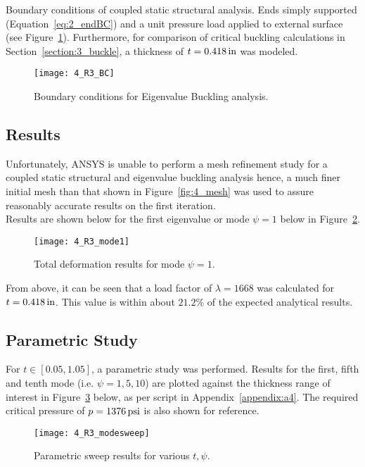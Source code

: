 Boundary conditions of coupled static structural analysis. Ends simply supported (Equation~\ref{eq:2_endBC}) and a unit pressure load applied to external surface (see Figure~\ref{fig:4_R3_BC}). Furthermore, for comparison of critical buckling calculations in Section~\ref{section:3_buckle}, a thickness of $t=0.418\,\mathrm{in}$ was modeled. 

\begin{figure}[H]
	\centering
	\texttt{[image: 4\_R3\_BC]}
	\caption{Boundary conditions for Eigenvalue Buckling analysis.}
	\label{fig:4_R3_BC}
\end{figure}

\subsection{Results}

Unfortunately, ANSYS is unable to perform a mesh refinement study for a coupled static structural and eigenvalue buckling analysis hence, a much finer initial mesh than that shown in Figure~\ref{fig:4_mesh} was used to assure reasonably accurate results on the first iteration.\\

Results are shown below for the first eigenvalue or mode $\psi = 1$ below in Figure~\ref{fig:4_R3_mode1}.
\begin{figure}[H]
	\centering
	\texttt{[image: 4\_R3\_mode1]}
	\caption{Total deformation results for mode $\psi = 1$.}
	\label{fig:4_R3_mode1}
\end{figure}

From above, it can be seen that a load factor of $\lambda = 1668$ was calculated for $t= 0.418\,\mathrm{in}$. This value is within about $21.2\%$ of the expected analytical results.

\subsection{Parametric Study}

For $t\in [0.05, 1.05]$, a parametric study was performed. Results for the first, fifth and tenth mode (i.e. $\psi = 1, 5, 10$) are plotted against the thickness range of interest in Figure~\ref{fig:4_R3_modesweep} below, as per \cite{PYTHON} script in Appendix~\ref{appendix:a4}. The required critical pressure of $p =1376\,\mathrm{psi}$ is also shown for reference.

\begin{figure}[H]
	\centering
	\texttt{[image: 4\_R3\_modesweep]}
	\caption{Parametric sweep results for various $t, \psi$.}
	\label{fig:4_R3_modesweep}
\end{figure}

